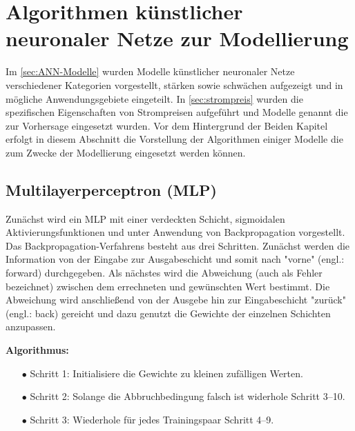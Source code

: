 


\section{Algorithmen künstlicher neuronaler Netze zur Modellierung} 

Im \autoref{sec:ANN-Modelle} wurden Modelle künstlicher neuronaler Netze verschiedener Kategorien vorgestellt, stärken sowie schwächen aufgezeigt und in mögliche Anwendungsgebiete eingeteilt. In \autoref{sec:strompreis} wurden die spezifischen Eigenschaften von Strompreisen aufgeführt und Modelle genannt die zur Vorhersage eingesetzt wurden. Vor dem Hintergrund der Beiden Kapitel erfolgt in diesem Abschnitt die Vorstellung der Algorithmen einiger Modelle die zum Zwecke der Modellierung eingesetzt werden können.

\subsection{Multilayerperceptron (MLP)}

Zunächst wird ein MLP mit einer verdeckten Schicht, sigmoidalen Aktivierungsfunktionen und unter Anwendung von Backpropagation vorgestellt. Das  Backpropagation-Verfahrens besteht aus drei Schritten. Zunächst werden die Information von der Eingabe zur Ausgabeschicht und somit nach "vorne" (engl.: forward) durchgegeben. Als nächstes wird die Abweichung (auch als Fehler bezeichnet) zwischen dem errechneten und gewünschten Wert bestimmt. Die Abweichung wird anschließend von der Ausgebe hin zur Eingabeschicht "zurück" (engl.: back) gereicht und dazu genutzt die Gewichte der einzelnen Schichten anzupassen.

\textbf{Algorithmus:}\,
\begin{itemize}
\item[\textbf{$\bullet$}] Schritt 1: Initialisiere die Gewichte zu kleinen zufälligen Werten.
\item[\textbf{$\bullet$}] Schritt 2: Solange die Abbruchbedingung falsch ist widerhole Schritt 3--10.
\item[\textbf{$\bullet$}] Schritt 3: Wiederhole für jedes Trainingspaar Schritt 4--9.
\end{itemize}

